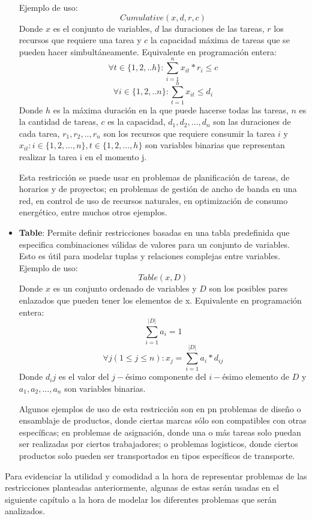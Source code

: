 \documentclass[12pt]{report}
\begin{document}
\begin{itemize}
    Ejemplo de uso:
    $$Cumulative(x,d,r, c)$$
    Donde $x$ es el conjunto de variables, $d$ las duraciones de las tareas, $r$ los recursos que requiere una tarea y $c$ la capacidad máxima de tareas que se pueden hacer simbultáneamente.
    Equivalente en programación entera:
    $$\forall t \in \{1,2,..h\}:\sum_{i=1}^nx_{it}*r_i\leq c$$
    $$\forall i \in \{1,2,..n\}:\sum_{t=1}^hx_{it}\leq d_i$$
    Donde $h$ es la máxima duración en la que puede hacerse todas las tareas, $n$ es la cantidad de tareas, $c$ es la capacidad, $d_1,d_2,...,d_n$ son las duraciones de cada tarea, $r_1,r_2,..,r_n$ son los recursos que requiere consumir la tarea $i$ y $x_{it}:i\in\{1,2,...,n\},t\in\{1,2,...,h\}$ son variables binarias que representan realizar la tarea i en el momento j.

    Esta restricción se puede usar en problemas de planificación de tareas, de horarios y de proyectos; en problemas de gestión de ancho de banda en una red, en control de uso de recursos naturales, en optimización de consumo energético, entre muchos otros ejemplos.\\
    
    \item \textbf{Table}: Permite definir restricciones basadas en una tabla predefinida que especifica combinaciones válidas de valores para un conjunto de variables. Esto es útil para modelar tuplas y relaciones complejas entre variables.
    Ejemplo de uso:
    $$Table(x,D)$$
    Donde $x$ es un conjunto ordenado de variables y $D$ son los posibles pares enlazados que pueden tener los elementos de x. 
    Equivalente en programación entera:
    $$\sum_{i=1}^{|D|}a_{i}=1$$
    $$\forall j(1\leq j\leq n):x_j=\sum_{i=1}^{|D|}a_i*d_{ij}$$
    Donde $d_ij$ es el valor del $j-$ésimo componente del $i-$ésimo elemento de $D$ y $a_1,a_2,...,a_n$ son variables binarias.

    Algunos ejemplos de uso de esta restricción son en pn problemas de diseño o ensamblaje de productos, donde ciertas marcas sólo son compatibles con otras específicas; en problemas de asignación, donde una o más tareas solo puedan ser realizadas por ciertos trabajadores; o problemas logisticos, donde ciertos productos solo pueden ser transportados en tipos específicos de transporte.
    
\end{itemize}

Para evidenciar la utilidad y comodidad a la hora de representar problemas de las restricciones planteadas anteriormente, algunas de estas serán usadas en el siguiente capítulo a la hora de modelar los diferentes problemas que serán analizados. 
\end{document}

